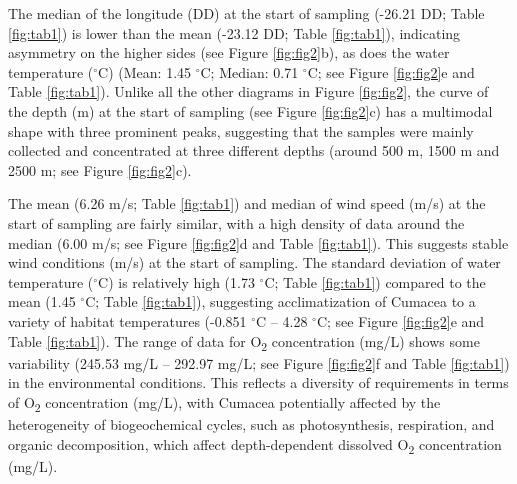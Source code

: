 {The median of the longitude (DD) at the start of sampling (-26.21 DD; Table \ref{fig:tab1}) is lower than the mean (-23.12 DD; Table \ref{fig:tab1}), indicating asymmetry on the higher sides (see Figure \ref{fig:fig2}b), as does the water temperature ($^\circ$C) (Mean: 1.45 $^\circ$C; Median: 0.71 $^\circ$C; see Figure \ref{fig:fig2}e and Table \ref{fig:tab1}). Unlike all the other diagrams in Figure \ref{fig:fig2}, the curve of the depth (m) at the start of sampling (see Figure \ref{fig:fig2}c) has a multimodal shape with three prominent peaks, suggesting that the samples were mainly collected and concentrated at three different depths (around 500 m, 1500 m and 2500 m; see Figure \ref{fig:fig2}c).

The mean (6.26 m/s; Table \ref{fig:tab1}) and median of wind speed (m/s) at the start of sampling are fairly similar, with a high density of data around the median (6.00 m/s; see Figure \ref{fig:fig2}d and Table \ref{fig:tab1}). This suggests stable wind conditions (m/s) at the start of sampling. The standard deviation of water temperature ($^\circ$C) is relatively high (1.73 $^\circ$C; Table \ref{fig:tab1}) compared to the mean (1.45 $^\circ$C; Table \ref{fig:tab1}), suggesting acclimatization of Cumacea to a variety of habitat temperatures (-0.851 $^\circ$C – 4.28 $^\circ$C; see Figure \ref{fig:fig2}e and Table \ref{fig:tab1}). The range of data for O\textsubscript{2} concentration (mg/L) shows some variability (245.53 mg/L – 292.97 mg/L; see Figure \ref{fig:fig2}f and Table \ref{fig:tab1}) in the environmental conditions. This reflects a diversity of requirements in terms of O\textsubscript{2} concentration (mg/L), with Cumacea potentially affected by the heterogeneity of biogeochemical cycles, such as photosynthesis, respiration, and organic decomposition, which affect depth-dependent dissolved O\textsubscript{2} concentration (mg/L).

}
